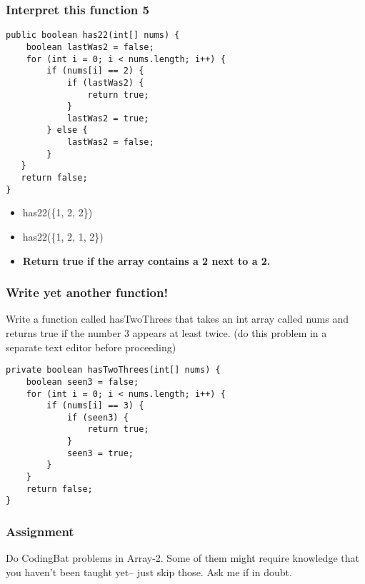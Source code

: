 \documentclass{beamer}
\begin{document}
\begin{frame}[fragile]
\frametitle{Interpret this function 5}

\begin{lstlisting}[style=basenopause]
public boolean has22(int[] nums) {
    boolean lastWas2 = false;
    for (int i = 0; i < nums.length; i++) {
        if (nums[i] == 2) {
            if (lastWas2) {
                return true;
            }
            lastWas2 = true;
        } else {
            lastWas2 = false;
        }
   }
   return false;
}
\end{lstlisting}
\begin{itemize}
\item<2-> {has22(\{1, 2, 2\})}
\item<3-> {has22(\{1, 2, 1, 2\})}
\item<4-> \textbf{Return true if the array contains a 2 next to a 2.}
\end{itemize}
\end{frame}

\begin{frame}[fragile]
\frametitle{Write yet another function!}
Write a function called hasTwoThrees that takes an int array called nums and returns true if the number 3 appears at least twice.
\pause
(do this problem in a separate text editor before proceeding)
\pause
\begin{lstlisting}
private boolean hasTwoThrees(int[] nums) {
    boolean seen3 = false;
    for (int i = 0; i < nums.length; i++) {
        if (nums[i] == 3) {
            if (seen3) {
                return true;
            }
            seen3 = true;
        }
    }
    return false;
}
\end{lstlisting}
\end{frame}

\begin{frame}
\frametitle{Assignment}
Do CodingBat problems in Array-2. Some of them might require knowledge that you haven't been taught yet-- just skip those. Ask me if in doubt.
\end{frame}
\end{document}
